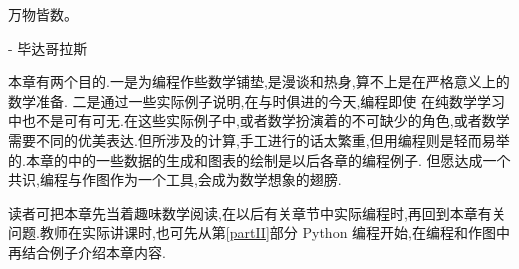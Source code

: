 \documentclass[main.tex]{subfiles}
\begin{document}
\begin{flushright}
	\begin{kaishu}
		万物皆数。\\
	\end{kaishu}
	- 毕达哥拉斯
\end{flushright}

本章有两个目的.一是为编程作些数学铺垫,是漫谈和热身,算不上是在严格意义上的数学准备.
二是通过一些实际例子说明,在与时俱进的今天,编程即使
在纯数学学习中也不是可有可无.在这些实际例子中,或者数学扮演着的不可缺少的角色,或者数学需要不同的优美表达.但所涉及的计算,手工进行的话太繁重,但用编程则是轻而易举的.本章的中的一些数据的生成和图表的绘制是以后各章的编程例子.
但愿达成一个共识,编程与作图作为一个工具,会成为数学想象的翅膀.

读者可把本章先当着趣味数学阅读,在以后有关章节中实际编程时,再回到本章有关问题.教师在实际讲课时,也可先从第\ref{partII}部分 Python 编程开始,在编程和作图中再结合例子介绍本章内容.
\end{document}

